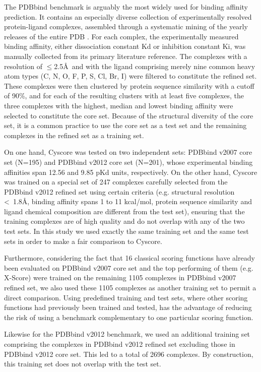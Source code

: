 \documentclass[linenumbers]{bmcart}
\begin{document}
The PDBbind \cite{529,530} benchmark is arguably the most widely used for binding affinity prediction. It contains an especially diverse collection of experimentally resolved protein-ligand complexes, assembled through a systematic mining of the yearly releases of the entire PDB \cite{540,537}. For each complex, the experimentally measured binding affinity, either dissociation constant Kd or inhibition constant Ki, was manually collected from its primary literature reference. The complexes with a resolution of $\le$2.5\AA\ and with the ligand comprising merely nine common heavy atom types (C, N, O, F, P, S, Cl, Br, I) were filtered to constitute the refined set. These complexes were then clustered by protein sequence similarity with a cutoff of 90\%, and for each of the resulting clusters with at least five complexes, the three complexes with the highest, median and lowest binding affinity were selected to constitute the core set. Because of the structural diversity of the core set, it is a common practice to use the core set as a test set and the remaining complexes in the refined set as a training set.

On one hand, Cyscore was tested on two independent sets: PDBbind v2007 core set (N=195) and PDBbind v2012 core set (N=201), whose experimental binding affinities span 12.56 and 9.85 pKd units, respectively. On the other hand, Cyscore was trained on a special set of 247 complexes carefully selected from the PDBbind v2012 refined set using certain criteria \cite{1372} (e.g. structural resolution \textless\ 1.8\AA, binding affinity spans 1 to 11 kcal/mol, protein sequence similarity and ligand chemical composition are different from the test set), ensuring that the training complexes are of high quality and do not overlap with any of the two test sets. In this study we used exactly the same training set and the same test sets in order to make a fair comparison to Cyscore.

Furthermore, considering the fact that 16 classical scoring functions have already been evaluated \cite{1313} on PDBbind v2007 core set and the top performing of them (e.g. X-Score) were trained on the remaining 1105 complexes in PDBbind v2007 refined set, we also used these 1105 complexes as another training set to permit a direct comparison. Using predefined training and test sets, where other scoring functions had previously been trained and tested, has the advantage of reducing the risk of using a benchmark complementary to one particular scoring function.

Likewise for the PDBbind v2012 benchmark, we used an additional training set comprising the complexes in PDBbind v2012 refined set excluding those in PDBbind v2012 core set. This led to a total of 2696 complexes. By construction, this training set does not overlap with the test set. %
\end{document}
